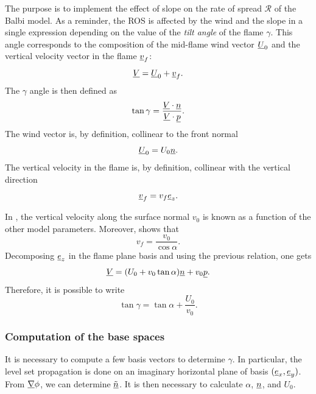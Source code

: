 The purpose is to implement the effect of slope on the rate of spread $\mathcal R$ of the Balbi model.
As a reminder, the ROS is affected by the wind and the slope in a single expression depending on the value of the \textit{tilt angle} of the flame $\gamma$.
This angle corresponds to the composition of the mid-flame wind vector $\underline{U}_0$ and the vertical velocity vector in the flame $\underline{v}_f$:
\begin{equation}
  \underline{V} = \underline{U}_0 + \underline{v}_f.
\end{equation}
The $\gamma$ angle is then defined as
\begin{equation}
  \tan \gamma = \frac{\underline{V} \cdot \underline{n}}{\underline{V} \cdot \underline{p}}.
\end{equation}
The wind vector is, by definition, collinear to the front normal
\begin{equation}
  \underline{U}_0 = U_0 \underline{n}.
\end{equation}
The vertical velocity in the flame is, by definition, collinear with the vertical direction
\begin{equation}
  \underline{v}_f = v_f \underline{e}_z.
\end{equation}

In \citep{Santoni2011}, the vertical velocity along the surface normal $v_0$ is known as a function of the other model parameters.
Moreover, \cite{Santoni2011} shows that
\begin{equation}
  v_f = \frac{v_0}{\cos \alpha}. 
\end{equation}
Decomposing $\underline{e}_z$ in the flame plane basis and using the previous relation, one gets 
\begin{equation}
  \underline{V} = (U_0 + v_0 \tan \alpha) \underline{n} + v_0 \underline{p}.
\end{equation}
Therefore, it is possible to write 
\begin{equation}
  \tan \gamma = \tan \alpha + \frac{U_0}{v_0}.
  \label{eq:tangamma}
\end{equation}

\subsubsection{Computation of the base spaces}

It is necessary to compute a few basis vectors to determine $\gamma$. In particular, the level set propagation is done on an imaginary horizontal plane of basis $(\underline{e}_x, \underline{e}_y)$.
From $\underline{\nabla} \phi$, we can determine $\underline{\tilde n}$.
It is then necessary to calculate $\alpha$, $\underline{n}$, and $U_0$.

